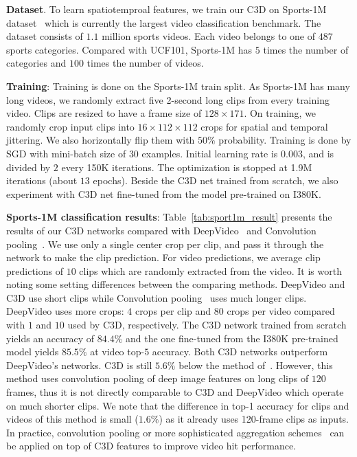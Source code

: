 \documentclass[10pt,twocolumn,letterpaper]{article}
\begin{document}
{\bf Dataset}. To learn spatiotemproal features, we train our C3D on Sports-1M dataset~\cite{Karpathy14} which is currently the largest video classification benchmark. The dataset consists of $1.1$ million sports videos. Each video belongs to one of $487$ sports categories. Compared with UCF101, Sports-1M has $5$ times the number of categories and $100$ times the number of videos.

{\bf Training}: Training is done on the Sports-1M train split. As Sports-1M has many long videos, we randomly extract five 2-second long clips from every training video. Clips are resized to have a frame size of $128 \times 171$. On training, we randomly crop input clips into $16 \times 112 \times 112$ crops for spatial and temporal jittering. We also horizontally flip them with $50\%$ probability. Training is done by SGD with mini-batch size of $30$ examples. Initial learning rate is $0.003$, and is divided by $2$ every 150K iterations. The optimization is stopped at 1.9M iterations (about $13$ epochs). Beside the C3D net trained from scratch, we also experiment with C3D net fine-tuned from the model pre-trained on I380K.

{\bf Sports-1M classification results}:  
Table~\ref{tab:sport1m_result} presents the results of our C3D networks compared with DeepVideo~\cite{Karpathy14} and Convolution pooling~\cite{Ng15}. We use only a single center crop per clip, and pass it through the network to make the clip prediction. For video predictions, we average clip predictions of $10$ clips which are randomly extracted from the video. It is worth noting some setting differences between the comparing methods. DeepVideo and C3D use short clips while Convolution pooling~\cite{Ng15} uses much longer clips. DeepVideo uses more crops: $4$ crops per clip and $80$ crops per video compared with $1$ and $10$ used by C3D, respectively. The C3D network trained from scratch yields an accuracy of $84.4\%$ and the one fine-tuned from the I380K pre-trained model yields $85.5\%$ at video top-$5$ accuracy. Both C3D networks outperform DeepVideo's networks. C3D is still $5.6\%$ below the method of~\cite{Ng15}. However, this method uses convolution pooling of deep image features on long clips of $120$ frames, thus it is not directly comparable to C3D and DeepVideo which operate on much shorter clips. We note that the difference in top-1 accuracy for clips and videos of this method is small ($1.6\%$) as it already uses 120-frame clips as inputs. In practice, convolution pooling or more sophisticated aggregation schemes~\cite{Ng15} can be applied on top of C3D features to improve video hit performance.
\end{document}
